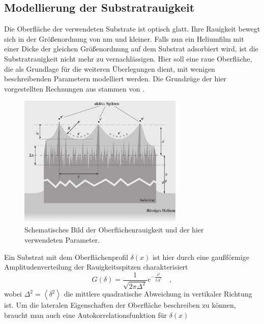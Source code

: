 \subsection{Modellierung der Substratrauigkeit}

Die Oberfläche der verwendeten Substrate ist optisch glatt. Ihre Rauigkeit bewegt sich in der Größenordnung von \unit[10]{nm} und kleiner. Falls nun ein Heliumfilm mit einer Dicke der gleichen Größenordnung auf dem Substrat adsorbiert wird, ist die Substratrauigkeit nicht mehr zu vernachlässigen. Hier soll eine raue Oberfläche, die als Grundlage für die weiteren Überlegungen dient, mit wenigen beschreibenden Parametern modelliert werden. Die Grundzüge der hier vorgestellten Rechnungen aus \cite{Kli02} stammen von  \cite{Tik62}.

\begin{figure}[h!tbp]
	\includegraphics[width=0.7\textwidth]{theo_zweikomponenten/two-fraction_model}%
	\hfill%
	\begin{minipage}[b]{0.3\textwidth-\tabcolsep}
		\caption[Schematische Darstellung der Parameter der Oberflächenrauigkeit]{Schematisches Bild der Oberflächenrauigkeit und der hier verwendeten Parameter.}
		\label{fig:real_substrate}
	\end{minipage}
\end{figure}
Ein Substrat mit dem Oberflächenprofil $\delta(x)$ ist hier durch eine gaußförmige Amplitudenverteilung der Rauigkeitsspitzen charakterisiert
    \begin{equation}
        \label{eqn:Ddelta}
        G(\delta)=\frac1{\sqrt{2\pi\Delta^2}}e^{-\frac{\delta^2}{2\Delta^2}}\quad,
    \end{equation}
wobei $\Delta^2=\left<\delta^2\right>$ die mittlere quadratische Abweichung in vertikaler Richtung ist. Um die lateralen Eigenschaften der Oberfläche beschreiben zu können, braucht man auch eine Autokorrelationsfunktion für $\delta(x)$
